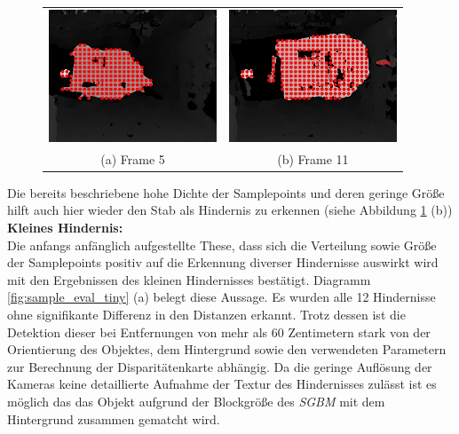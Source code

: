 \begin{figure}[h]
	\centering
	\begin{tabular}{cc}
	\includegraphics[width=5cm]{img/evaluation/sample_tiny_test_5_disparity}&
	\includegraphics[width=5cm]{img/evaluation/sample_tiny_test_11_disparity}\\
	(a) Frame 5 &  (b) Frame 11
	\end{tabular}
	\caption{}
	\label{fig:sample_eval_medium_fails}
\end{figure}

\noindent
Die bereits beschriebene hohe Dichte der Samplepoints und deren geringe Größe hilft auch hier wieder den Stab als Hindernis zu erkennen (siehe Abbildung \ref{fig:sample_eval_medium_fails} (b))\\


\noindent
\textbf{Kleines Hindernis:}\\
Die anfangs anfänglich aufgestellte These, dass sich die Verteilung sowie Größe der Samplepoints positiv auf die Erkennung diverser Hindernisse auswirkt wird mit den Ergebnissen des kleinen Hindernisses bestätigt. Diagramm \ref{fig:sample_eval_tiny} (a) belegt diese Aussage. Es wurden alle 12 Hindernisse ohne signifikante Differenz in den Distanzen erkannt. Trotz dessen ist die Detektion dieser bei Entfernungen von mehr als 60 Zentimetern stark von der Orientierung des Objektes, dem Hintergrund sowie den verwendeten Parametern zur Berechnung der Disparitätenkarte abhängig. Da die geringe Auflösung der Kameras keine detaillierte Aufnahme der Textur des Hindernisses zulässt ist es möglich das das Objekt aufgrund der Blockgröße des \emph{SGBM} mit dem Hintergrund zusammen gematcht wird. 

